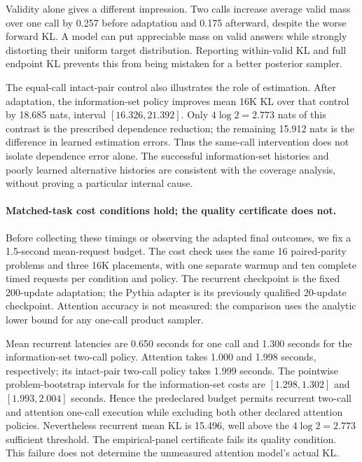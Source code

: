 \begin{table}[t]
\centering\small
\caption{Predeclared 16K paired-parity aggregate, equally weighting positions
within each of 16 problems. KL gain is one-call minus two-call KL;
positive is favorable. Intervals concern problems, not training seeds.}
\resizebox{\linewidth}{!}{}
\label{tab:primary}
\end{table}

Validity alone gives a different impression. Two calls increase average valid
mass over one call by 0.257 before adaptation and 0.175 afterward, despite the
worse forward KL. A model can put appreciable mass on valid answers while
strongly distorting their uniform target distribution. Reporting within-valid
KL and full endpoint KL prevents this from being mistaken for a better
posterior sampler.

The equal-call intact-pair control also illustrates the role of estimation.
After adaptation, the information-set policy improves mean 16K KL over that
control by 18.685 nats, interval $[16.326,21.392]$. Only $4\log2=2.773$ nats
of this contrast is the prescribed dependence reduction; the remaining
15.912 nats is the difference in learned estimation errors. Thus the
same-call intervention does not isolate dependence error alone.
The successful information-set histories and poorly learned alternative
histories are consistent with the coverage analysis, without proving a
particular internal cause.

\paragraph{Matched-task cost conditions hold; the quality certificate does not.}
Before collecting these timings or observing the adapted final outcomes, we
fix a 1.5-second mean-request budget. The cost check uses the same 16
paired-parity problems and three 16K placements, with one separate warmup and
ten complete timed requests per condition and policy. The recurrent checkpoint
is the fixed 200-update adaptation; the Pythia adapter is its previously
qualified 20-update checkpoint. Attention accuracy is not measured: the
comparison uses the analytic lower bound for any one-call product sampler.

Mean recurrent latencies are 0.650 seconds for one call and 1.300 seconds for
the information-set two-call policy. Attention takes 1.000 and 1.998 seconds,
respectively; its intact-pair two-call policy takes 1.999 seconds. The
pointwise problem-bootstrap intervals for the information-set costs are
$[1.298,1.302]$ and $[1.993,2.004]$ seconds. Hence the predeclared budget permits
recurrent two-call and attention one-call execution while excluding both
other declared attention policies. Nevertheless recurrent mean KL is 15.496,
well above the $4\log2=2.773$ sufficient threshold. The empirical-panel
certificate fails its quality condition. This failure does not determine the
unmeasured attention model's actual KL.

